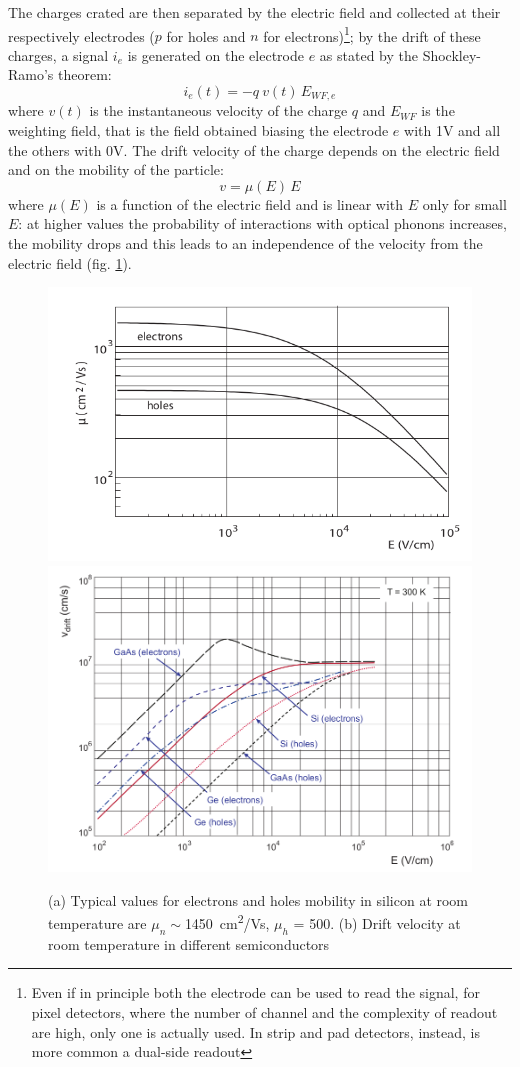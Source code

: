    The charges crated are then separated by the electric field and collected at their respectively electrodes ($p$ for holes and $n$ for electrons)\footnote{Even if in principle both the electrode can be used to read the signal, for pixel detectors, where the number of channel and the complexity of readout are high, only one is actually used. In strip and pad detectors, instead, is more common a dual-side readout}; by the drift of these charges, a signal $i_e$ is generated on the  electrode $e$ as stated by the Shockley-Ramo's theorem: 
    \begin{equation}
        i_e(t) = -q\: v(t)\, E_{WF,e}
    \end{equation}
    where $v(t)$ is the instantaneous velocity of the charge $q$ and $E_{WF}$ is the weighting field, that is the field obtained biasing the electrode $e$ with 1V and all the others with 0V. The drift velocity of the charge depends on the electric field and on the mobility of the particle:
    \begin{equation}
        v = \mu(E)\, E
    \end{equation}
    where $\mu(E)$ is a function of the electric field and is linear with $E$ only for small $E$: at higher values the probability of interactions with optical phonons increases, the mobility drops and this leads to an independence of the velocity from the electric field (fig. \ref{fig:mobility_drift}).
   
    \begin{figure}[h!]
        \centering
        \includegraphics[width=.49\linewidth]{figures/Pixel_detectors/mobility_in_semiconductor.png}
        \includegraphics[width=.45\linewidth]{figures/Pixel_detectors/velocity_in_semiconductor.png}
        \caption{(a) Typical values for electrons and holes mobility 
        in silicon at room temperature are $\mu _n \sim$\SI{1450}{cm\squared/Vs}, $\mu _h$ = 500. (b) Drift velocity at room temperature in different semiconductors}
        \label{fig:mobility_drift}
    \end{figure}


